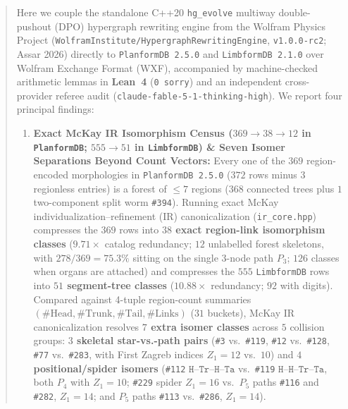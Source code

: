 \documentclass[11pt,a4paper]{article}
\theoremstyle{definition}
\theoremstyle{remark}
\begin{document}
\begin{abstract}
Here we couple the standalone C++20 \texttt{hg\_evolve} multiway double-pushout (DPO) hypergraph rewriting engine from the Wolfram Physics Project (\texttt{WolframInstitute/HypergraphRewritingEngine}, \texttt{v1.0.0-rc2}; Assar 2026) directly to \texttt{PlanformDB~2.5.0} and \texttt{LimbformDB~2.1.0} over Wolfram Exchange Format (WXF), accompanied by machine-checked arithmetic lemmas in \textbf{Lean~4} (\texttt{0 sorry}) and an independent cross-provider referee audit (\texttt{claude-fable-5-1-thinking-high}). We report four principal findings:
\begin{enumerate}
  \item \textbf{Exact McKay IR Isomorphism Census ($369 \to 38 \to 12$ in \texttt{PlanformDB}; $555 \to 51$ in \texttt{LimbformDB}) \& Seven Isomer Separations Beyond Count Vectors:} Every one of the $369$ region-encoded morphologies in \texttt{PlanformDB~2.5.0} ($372$ rows minus $3$ regionless entries) is a forest of $\le 7$ regions ($368$ connected trees plus $1$ two-component split worm \texttt{\#394}). Running exact McKay individualization--refinement (IR) canonicalization (\texttt{ir\_core.hpp}) compresses the $369$ rows into \textbf{$38$ exact region-link isomorphism classes} ($9.71\times$ catalog redundancy; $12$ unlabelled forest skeletons, with $278/369 = 75.3\%$ sitting on the single 3-node path $P_3$; $126$ classes when organs are attached) and compresses the $555$ \texttt{LimbformDB} rows into \textbf{$51$ segment-tree classes} ($10.88\times$ redundancy; $92$ with digits). Compared against 4-tuple region-count summaries $(\#\text{Head}, \#\text{Trunk}, \#\text{Tail}, \#\text{Links})$ ($31$ buckets), McKay IR canonicalization resolves \textbf{$7$ extra isomer classes} across $5$ collision groups: \textbf{$3$ skeletal star-vs.-path pairs} (\texttt{\#3} vs.\ \texttt{\#119}, \texttt{\#12} vs.\ \texttt{\#128}, \texttt{\#77} vs.\ \texttt{\#283}, with First Zagreb indices $Z_1 = 12$ vs.\ $10$) and \textbf{$4$ positional/spider isomers} (\texttt{\#112} $\mathtt{H\text{--}Tr\text{--}H\text{--}Ta}$ vs.\ \texttt{\#119} $\mathtt{H\text{--}H\text{--}Tr\text{--}Ta}$, both $P_4$ with $Z_1 = 10$; \texttt{\#229} spider $Z_1 = 16$ vs.\ $P_5$ paths \texttt{\#116} and \texttt{\#282}, $Z_1 = 14$; and $P_5$ paths \texttt{\#113} vs.\ \texttt{\#286}, $Z_1 = 14$).

\end{enumerate}
\end{abstract}
\end{document}
